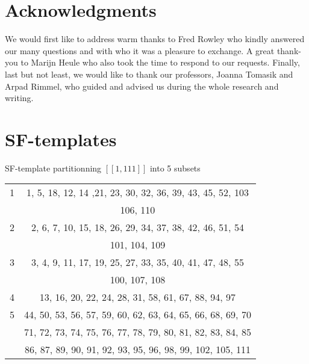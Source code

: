 \documentclass{article}
\newtheorem{computational theorem}{Computational Theorem}[section]
\begin{document}
\section{Acknowledgments}

\par
We would first like to address warm thanks to Fred Rowley who kindly answered our many questions and with who it was a pleasure
to exchange. A great thank-you to Marijn Heule who also took the time to respond to our requests. Finally, last but not least, we would
like to thank our professors, Joanna Tomasik and Arpad Rimmel, who guided and advised us during the whole research and writing.





\appendix
\renewcommand{\arraystretch}{1}
\section{SF-templates}
\begin{center}
SF-template partitionning \([\![1, 111]\!]\) into 5 subsets
\begin{tabular}{|*{2}{c|}}
	\hline
	1 & 1, 5, 18, 12, 14 ,21, 23, 30, 32, 36, 39, 43, 45, 52, 103 \\
	 & 106, 110 \\
	\hline
	2 & 2, 6, 7, 10, 15, 18, 26, 29, 34, 37, 38, 42, 46, 51, 54 \\
	& 101, 104, 109 \\
	\hline
	3 & 3, 4, 9, 11, 17, 19, 25, 27, 33, 35, 40, 41, 47, 48, 55 \\
	& 100, 107, 108 \\
	\hline
	4 & 13, 16, 20, 22, 24, 28, 31, 58, 61, 67, 88, 94, 97 \\
	\hline
	5 & 44, 50, 53, 56, 57, 59, 60, 62, 63, 64, 65, 66, 68, 69, 70\\
	& 71, 72, 73, 74, 75, 76, 77, 78, 79, 80, 81, 82, 83, 84, 85\\
	& 86, 87, 89, 90, 91, 92, 93, 95, 96, 98, 99, 102, 105, 111 \\
	\hline
\end{tabular}
\end{center}
\end{document}
